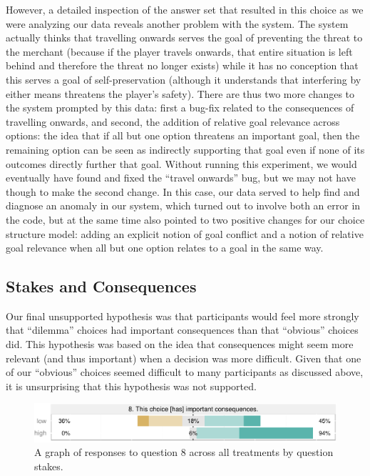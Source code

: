 However, a detailed inspection of the answer set that resulted in this choice as we were analyzing our data reveals another problem with the system.
%
The system actually thinks that travelling onwards serves the goal of preventing the threat to the merchant (because if the player travels onwards, that entire situation is left behind and therefore the threat no longer exists) while it has no conception that this serves a goal of self-preservation (although it understands that interfering by either means threatens the player's safety).
%
There are thus two more changes to the system prompted by this data: first a bug-fix related to the consequences of travelling onwards, and second, the addition of relative goal relevance across options: the idea that if all but one option threatens an important goal, then the remaining option can be seen as indirectly supporting that goal even if none of its outcomes directly further that goal.
%
Without running this experiment, we would eventually have found and fixed the ``travel onwards'' bug, but we may not have though to make the second change.
%
In this case, our data served to help find and diagnose an anomaly in our system, which turned out to involve both an error in the code, but at the same time also pointed to two positive changes for our choice structure model: adding an explicit notion of goal conflict and a notion of relative goal relevance when all but one option relates to a goal in the same way.

\subsection{Stakes and Consequences}

Our final unsupported hypothesis was that participants would feel more strongly that ``dilemma'' choices had important consequences than that ``obvious'' choices did.
%
This hypothesis was based on the idea that consequences might seem more relevant (and thus important) when a decision was more difficult.
%
Given that one of our ``obvious'' choices seemed difficult to many participants as discussed above, it is unsurprising that this hypothesis was not supported.


\begin{figure}[!h]
  \includegraphics[width=\textwidth]{fig/stakes-q8.pdf}
  \caption{A graph of responses to question 8 across all treatments by question stakes.}
  \label{fig:stakesq8}
\end{figure}


